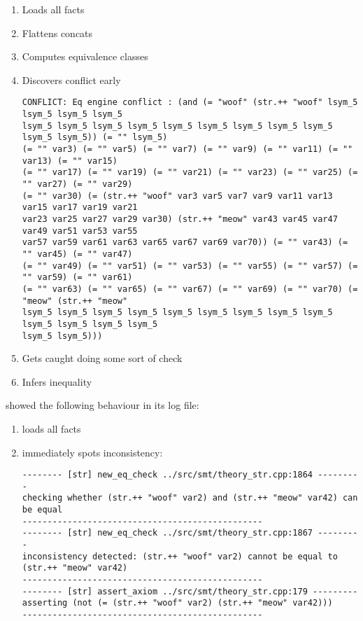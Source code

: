         \begin{enumerate}
            \item Loads all facts
            \item Flattens concats
            \item Computes equivalence classes
            \item Discovers conflict early
                {\scriptsize\begin{verbatim}
CONFLICT: Eq engine conflict : (and (= "woof" (str.++ "woof" lsym_5 lsym_5 lsym_5 lsym_5
lsym_5 lsym_5 lsym_5 lsym_5 lsym_5 lsym_5 lsym_5 lsym_5 lsym_5 lsym_5 lsym_5)) (= "" lsym_5)
(= "" var3) (= "" var5) (= "" var7) (= "" var9) (= "" var11) (= "" var13) (= "" var15)
(= "" var17) (= "" var19) (= "" var21) (= "" var23) (= "" var25) (= "" var27) (= "" var29)
(= "" var30) (= (str.++ "woof" var3 var5 var7 var9 var11 var13 var15 var17 var19 var21
var23 var25 var27 var29 var30) (str.++ "meow" var43 var45 var47 var49 var51 var53 var55
var57 var59 var61 var63 var65 var67 var69 var70)) (= "" var43) (= "" var45) (= "" var47)
(= "" var49) (= "" var51) (= "" var53) (= "" var55) (= "" var57) (= "" var59) (= "" var61)
(= "" var63) (= "" var65) (= "" var67) (= "" var69) (= "" var70) (= "meow" (str.++ "meow"
lsym_5 lsym_5 lsym_5 lsym_5 lsym_5 lsym_5 lsym_5 lsym_5 lsym_5 lsym_5 lsym_5 lsym_5 lsym_5
lsym_5 lsym_5)))
                \end{verbatim}}
            \item Gets caught doing some sort of check
            \item Infers inequality
        \end{enumerate}

        \us{} showed the following behaviour in its log file:

        \begin{enumerate}
            \item loads all facts
            \item immediately spots inconsistency:
                {\scriptsize\begin{verbatim}
-------- [str] new_eq_check ../src/smt/theory_str.cpp:1864 ---------
checking whether (str.++ "woof" var2) and (str.++ "meow" var42) can be equal
------------------------------------------------
-------- [str] new_eq_check ../src/smt/theory_str.cpp:1867 ---------
inconsistency detected: (str.++ "woof" var2) cannot be equal to (str.++ "meow" var42)
------------------------------------------------
-------- [str] assert_axiom ../src/smt/theory_str.cpp:179 ---------
asserting (not (= (str.++ "woof" var2) (str.++ "meow" var42)))
------------------------------------------------
                \end{verbatim}}
        \end{enumerate}

